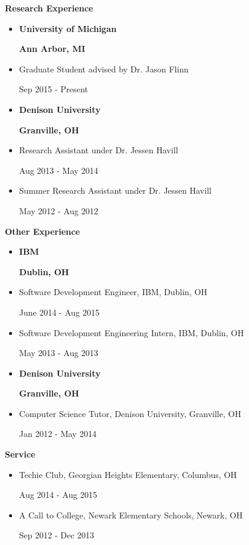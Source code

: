 \documentclass[letterpaper,11pt]{article}
\newlength \firstcol
\newcommand{\resheading}[1]{{\large \colorbox{mygrey}{\begin{minipage}{\textwidth}{\textbf{#1\vphantom{p\^{E}}}}\end{minipage}}}}
\newcommand{\reitem}[2]{
\begin{minipage}[t]{\firstcol}
#2
\end{minipage}
\null\hfill
\begin{minipage}[t]{4cm}
\flushright
#1
\end{minipage}
}
\newcommand{\heading}[4]{
\vspace{#1}
\begin{minipage}{8cm}
\flushleft
\textbf{#2}
\end{minipage}
\null\hfill
\begin{minipage}{7cm}
\flushright 
\textbf{#3}
\end{minipage}
\vspace{#4}
}
\begin{document}
\resheading{Research Experience}
\begin{itemize}
\item[] \heading{0em}{University of Michigan}{Ann Arbor, MI}{.25em}
\item[] \reitem{Sep 2015 - Present}{Graduate Student advised by Dr. Jason Flinn}
\item[] \heading{.25em}{Denison University}{Granville, OH}{.25em}
\item[] \reitem{Aug 2013 - May 2014}{Research Assistant under Dr. Jessen Havill}
\item[] \reitem{May 2012 - Aug 2012}{Summer Research Assistant under Dr. Jessen Havill}
\end{itemize}

\resheading{Other Experience}
\begin{itemize}
\item[]	\heading{0em}{IBM}{Dublin, OH}{.25em}
\item[] \reitem{June 2014 - Aug 2015}{Software Development Engineer, IBM, Dublin, OH}
\item[] \reitem{May 2013 - Aug 2013}{Software Development Engineering Intern, IBM, Dublin, OH}
\item[]	\heading{.5em}{Denison University}{Granville, OH}{.25em}
\item[] \reitem{Jan 2012 - May 2014}{Computer Science Tutor, Denison University, Granville, OH}
\end{itemize}

\resheading{Service}
\begin{itemize}
\item[] \reitem{Aug 2014 - Aug 2015}{Techie Club, Georgian Heights Elementary, Columbus, OH}
\item[] \reitem{Sep 2012 - Dec 2013}{A Call to College, Newark Elementary Schools, Newark, OH}
\end{itemize}
\end{document}
